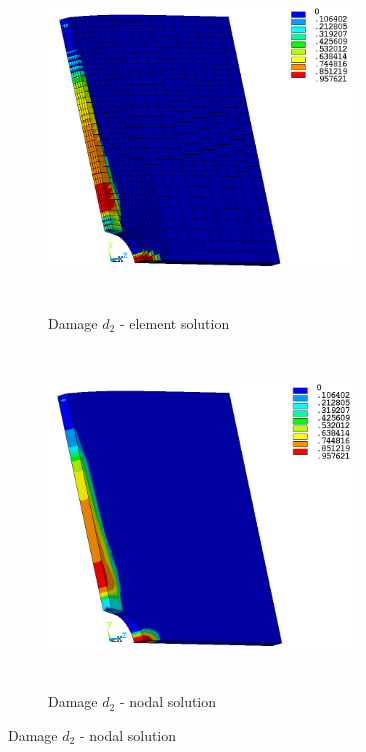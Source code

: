 \documentclass[12pt,a4paper,twoside,openright]{report}
\begin{document}
\FloatBarrier
\vspace*{1.5cm}
\begin{figure}[htbp!]\ContinuedFloat     
     \begin{subfigure}[b]{0.4\textwidth}
        \includegraphics[width=8.2cm,height=9cm]{27.d2-lt-e.png}
         \caption{Damage $d_{2}$ - element solution}
         \label{fig:d2-lt-e}
     \end{subfigure}
    \hspace{1.9cm}
      \begin{subfigure}[b]{0.4\textwidth}
         \includegraphics[width=8.2cm,height=9cm]{27.d2-lt-n.png}
         \caption{Damage $d_{2}$ - nodal solution}
         \label{fig:d2-lt-n}
     \end{subfigure}
\end{figure}
\FloatBarrier
\end{document}
